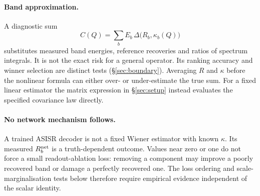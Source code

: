\paragraph{Band approximation.} A diagnostic sum
\begin{equation}\label{eq:crit}
C(Q)=\sum_b E_b\,\Delta\big(R_b,\kappa_b(Q)\big)
\end{equation}
substitutes measured band energies, reference recoveries and ratios of spectrum integrals. It is not the exact risk for a general operator. Its ranking accuracy and winner selection are distinct tests (\S\ref{sec:boundary}). Averaging $R$ and $\kappa$ before the nonlinear formula can either over- or under-estimate the true sum. For a fixed linear estimator the matrix expression in \S\ref{sec:setup} instead evaluates the specified covariance law directly.

\paragraph{No network mechanism follows.} A trained ASISR decoder is not a fixed Wiener estimator with known $\kappa$. Its measured $R_b^{\mathrm{net}}$ is a truth-dependent outcome. Values near zero or one do not force a small readout-ablation loss: removing a component may improve a poorly recovered band or damage a perfectly recovered one. The loss ordering and scale-marginalisation tests below therefore require empirical evidence independent of the scalar identity.
